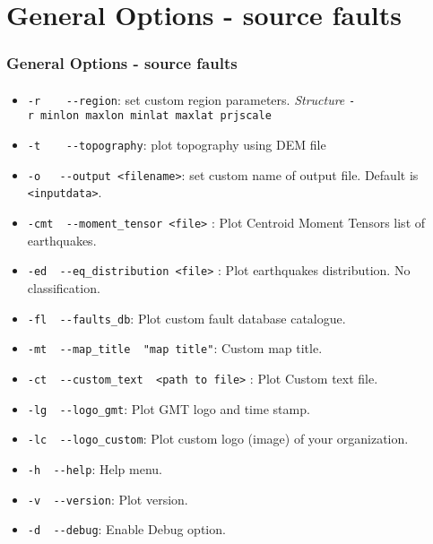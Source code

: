 \section[General arg]{General Options - source faults}

\graphicspath{{Chapter4/Figs/Vector/}{Figs/}}

\begin{frame}
  \frametitle{General Options - source faults}
  \framesubtitle{}
  \label{fr4:hist_pics}
\begin{scriptsize}
\begin{itemize}
\item
  \texttt{-r\ \ \ \textbar{}\ -\/-region}: set custom region parameters.
  \emph{Structure} \texttt{-r\ minlon\ maxlon\ minlat\ maxlat\ prjscale}
\item
  \texttt{-t\ \ \ \textbar{}\ -\/-topography}: plot topography using DEM
  file
\item
  \texttt{-o\ \ \textbar{}\ -\/-output\ \textless{}filename\textgreater{}}:
  set custom name of output file. Default is
  \texttt{\textless{}inputdata\textgreater{}}.
\item
  \texttt{-cmt\ \textbar{}\ -\/-moment\_tensor\ \textless{}file\textgreater{}}
  : Plot Centroid Moment Tensors list of earthquakes.
\item
  \texttt{-ed\ \textbar{}\ -\/-eq\_distribution\ \textless{}file\textgreater{}}
  : Plot earthquakes distribution. No classification.
\item
  \texttt{-fl\ \textbar{}\ -\/-faults\_db}: Plot custom fault database
  catalogue.
\item
  \texttt{-mt\ \textbar{}\ -\/-map\_title\ \ "map\ title"}: Custom map
  title.
\item
  \texttt{-ct\ \textbar{}\ -\/-custom\_text\ \ \textless{}path\ to\ file\textgreater{}}
  : Plot Custom text file.
\item
  \texttt{-lg\ \textbar{}\ -\/-logo\_gmt}: Plot GMT logo and time stamp.
\item
  \texttt{-lc\ \textbar{}\ -\/-logo\_custom}: Plot custom logo (image)
  of your organization.
\item
  \texttt{-h\ \textbar{}\ -\/-help}: Help menu.
\item
  \texttt{-v\ \textbar{}\ -\/-version}: Plot version.
\item
  \texttt{-d\ \textbar{}\ -\/-debug}: Enable Debug option.
\end{itemize}
\end{scriptsize}
\end{frame}
\note{}

